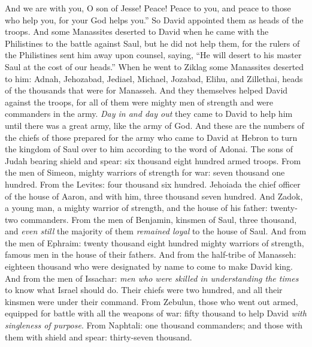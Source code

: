 \begin{biblechapter}
And we are with you, O son of Jesse! 
Peace! Peace to you, and peace to those who help you, 
for your God helps you.” So David appointed them as heads of the troops.
\verse And some Manassites deserted to David when he came with the Philistines to the battle against Saul, but he did not help them, for the rulers of the Philistines sent him away upon counsel, saying, “He will desert to his master Saul at the cost of our heads.”
\verse When he went to Ziklag some Manassites deserted to him: Adnah, Jehozabad, Jediael, Michael, Jozabad, Elihu, and Zillethai, heads of the thousands that were for Manasseh.
\verse And they themselves helped David against the troops, for all of them were mighty men of strength and were commanders in the army.
\verse \textit{Day in and day out} they came to David to help him until there was a great army, like the army of God.
\verse And these are the numbers of the chiefs of those prepared for the army who came to David at Hebron to turn the kingdom of Saul over to him according to the word of Adonai.
\verse The sons of Judah bearing shield and spear: six thousand eight hundred armed troops.
\verse From the men of Simeon, mighty warriors of strength for war: seven thousand one hundred.
\verse From the Levites: four thousand six hundred.
\verse Jehoiada the chief officer of the house of Aaron, and with him, three thousand seven hundred.
\verse And Zadok, a young man, a mighty warrior of strength, and the house of his father: twenty-two commanders.
\verse From the men of Benjamin, kinsmen of Saul, three thousand, and \textit{even still} the majority of them \textit{remained loyal} to the house of Saul.
\verse And from the men of Ephraim: twenty thousand eight hundred mighty warriors of strength, famous men in the house of their fathers.
\verse And from the half-tribe of Manasseh: eighteen thousand who were designated by name to come to make David king.
\verse And from the men of Issachar: \textit{men who were skilled in understanding the times} to know what Israel should do. Their chiefs were two hundred, and all their kinsmen were under their command.
\verse From Zebulun, those who went out armed, equipped for battle with all the weapons of war: fifty thousand to help David \textit{with singleness of purpose}.
\verse From Naphtali: one thousand commanders; and those with them with shield and spear: thirty-seven thousand.

\end{biblechapter}
